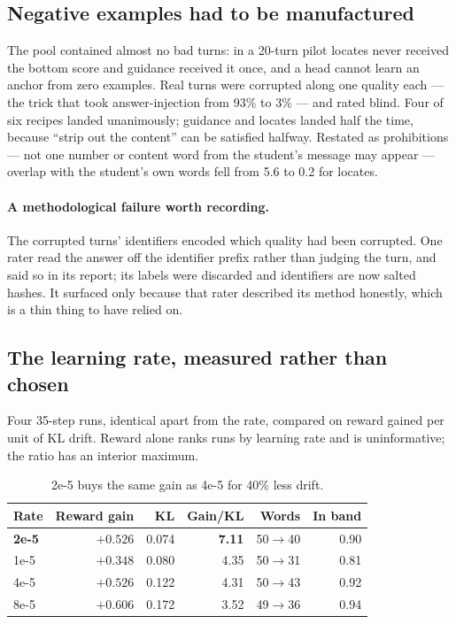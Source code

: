 \documentclass[11pt]{article}
\newcommand{\qual}[1]{\textsf{#1}}
\begin{document}
\subsection{Negative examples had to be manufactured}

The pool contained almost no bad turns: in a 20-turn pilot \qual{locates} never received the bottom score
and \qual{guidance} received it once, and a head cannot learn an anchor from zero examples. Real turns
were corrupted along one quality each --- the trick that took answer-injection from 93\% to 3\% --- and
rated blind. Four of six recipes landed unanimously; \qual{guidance} and \qual{locates} landed half the
time, because ``strip out the content'' can be satisfied halfway. Restated as prohibitions --- not one
number or content word from the student's message may appear --- overlap with the student's own words fell
from 5.6 to 0.2 for \qual{locates}.

\paragraph{A methodological failure worth recording.} The corrupted turns' identifiers encoded which
quality had been corrupted. One rater read the answer off the identifier prefix rather than judging the
turn, and said so in its report; its labels were discarded and identifiers are now salted hashes. It
surfaced only because that rater described its method honestly, which is a thin thing to have relied on.

\subsection{The learning rate, measured rather than chosen}

Four 35-step runs, identical apart from the rate, compared on reward gained per unit of KL drift. Reward
alone ranks runs by learning rate and is uninformative; the ratio has an interior maximum.

\begin{table}[h]
\centering
\begin{tabular}{lrrrrr}
\toprule
\textbf{Rate} & \textbf{Reward gain} & \textbf{KL} & \textbf{Gain/KL} & \textbf{Words} & \textbf{In band} \\
\midrule
\textbf{2e-5} & $+0.526$ & 0.074 & \textbf{7.11} & 50$\rightarrow$40 & 0.90 \\
1e-5 & $+0.348$ & 0.080 & 4.35 & 50$\rightarrow$31 & 0.81 \\
4e-5 & $+0.526$ & 0.122 & 4.31 & 50$\rightarrow$43 & 0.92 \\
8e-5 & $+0.606$ & 0.172 & 3.52 & 49$\rightarrow$36 & 0.94 \\
\bottomrule
\end{tabular}
\caption{2e-5 buys the same gain as 4e-5 for 40\% less drift.}
\label{tab:lr}
\end{table}
\end{document}
